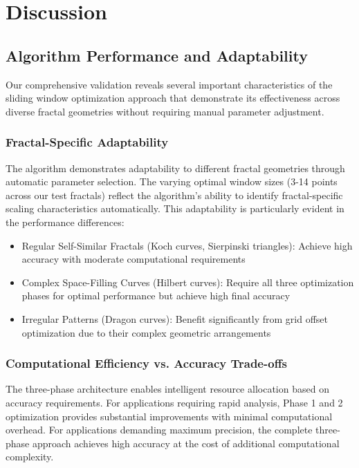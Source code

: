 \documentclass[preprint,12pt]{elsarticle}
\def\textbf#1{#1}%
\begin{document}
\section{Discussion}
\label{sec:discussion}

\subsection{Algorithm Performance and Adaptability}

Our comprehensive validation reveals several important characteristics of the sliding window optimization approach that demonstrate its effectiveness across diverse fractal geometries without requiring manual parameter adjustment.

\subsubsection{Fractal-Specific Adaptability}

The algorithm demonstrates adaptability to different fractal geometries through automatic parameter selection. The varying optimal window sizes (3-14 points across our test fractals) reflect the algorithm's ability to identify fractal-specific scaling characteristics automatically. This adaptability is particularly evident in the performance differences:

\begin{itemize}
\item \textbf{Regular Self-Similar Fractals} (Koch curves, Sierpinski triangles): Achieve high accuracy with moderate computational requirements
\item \textbf{Complex Space-Filling Curves} (Hilbert curves): Require all three optimization phases for optimal performance but achieve high final accuracy
\item \textbf{Irregular Patterns} (Dragon curves): Benefit significantly from grid offset optimization due to their complex geometric arrangements
\end{itemize}

\subsubsection{Computational Efficiency vs. Accuracy Trade-offs}

The three-phase architecture enables intelligent resource allocation based on accuracy requirements. For applications requiring rapid analysis, Phase 1 and 2 optimization provides substantial improvements with minimal computational overhead. For applications demanding maximum precision, the complete three-phase approach achieves high accuracy at the cost of additional computational complexity.
\end{document}
